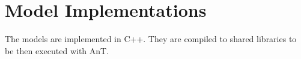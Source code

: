 \section{Model Implementations}
\label{app:impl.models}

The models are implemented in C++.
They are compiled to shared libraries to be then executed with AnT.


